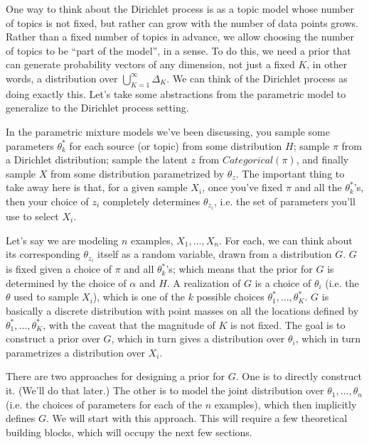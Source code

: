 
One way to think about the Dirichlet process is as a topic model whose number of topics is not fixed, but rather can grow with the number of data points grows. Rather than a fixed number of topics in advance, we allow choosing the number of topics to be ``part of the model'', in a sense. To do this, we need a prior that can generate probability vectors of any dimension, not just a fixed $K$, in other words, a distribution over $\bigcup_{K=1}^\infty \Delta_K$. We can think of the Dirichlet process as doing exactly this. Let's take some abstractions from the parametric model to generalize to the Dirichlet process setting.

In the parametric mixture models we've been discussing, you sample some parameters $\theta_k^*$ for each source (or topic) from some distribution $H$; sample $\pi$ from a Dirichlet distribution; sample the latent $z$ from $Categorical(\pi)$, and finally sample $X$ from some distribution parametrized by $\theta_{z}$. The important thing to take away here is that, for a given sample $X_i$, once you've fixed $\pi$ and all the $\theta_k^*$'s, then your choice of $z_i$ completely determines $\theta_{z_i}$, i.e. the set of parameters you'll use to select $X_i$. 

Let's say we are modeling $n$ examples, $X_1, \ldots, X_n$. For each, we can think about its corresponding $\theta_{z_i}$ itself as a random variable, drawn from a distribution $G$. $G$ is fixed given a choice of $\pi$ and all $\theta_{k}^*$'s; which means that the prior for $G$ is determined by the choice of $\alpha$ and $H$. A realization of $G$ is a choice of $\theta_i$ (i.e. the $\theta$ used to sample $X_i$), which is one of the $k$ possible choices $\theta_1^*, \ldots, \theta_{K}^*$. $G$ is basically a discrete distribution with point masses on all the locations defined by $\theta_1^*, \ldots, \theta_{K}^*$, with the caveat that the magnitude of $K$ is not fixed. The goal is to construct a prior over $G$, which in turn gives a distribution over $\theta_i$, which in turn parametrizes a distribution over $X_i$.

There are two approaches for designing a prior for $G$. One is to directly construct it. (We'll do that later.) The other is to model the joint distribution over $\theta_1, \ldots, \theta_n$ (i.e. the choices of parameters for each of the $n$ examples), which then implicitly defines $G$. We will start with this approach. This will require a few theoretical building blocks, which will occupy the next few sections.

